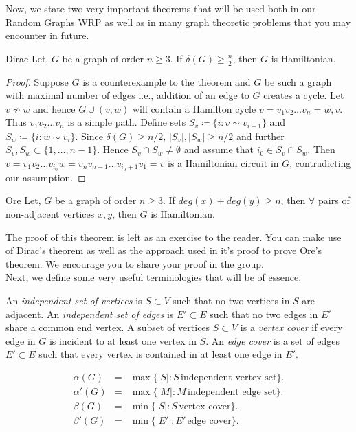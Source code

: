 \documentclass[../basic_graph_theory.tex]{subfiles}
\begin{document}
Now, we state two very important theorems that will be used both in our Random Graphs WRP as well as in many graph theoretic problems that you may encounter in future.

\begin{Thm}{Dirac}{}
    Let, $G$ be a graph of order $n \ge 3$. If $\delta(G) \ge \frac{n}{2}$, then $G$ is Hamiltonian.
\end{Thm}
\begin{proof}
    Suppose $G$ is a counterexample to the theorem and $G$ be such a graph with maximal number of edges i.e., addition of an edge to $G$ creates a cycle.  Let $v \nsim w$ and hence $G \cup (v,w)$ will contain a Hamilton cycle $v = v_1v_2\ldots v_n=w,v$. Thus $v_1v_2\ldots v_n$ is a simple path. Define sets $S_v \coloneqq \{ i : v \sim v_{i+1} \}$ and $S_w \coloneqq \{ i : w \sim v_i\}$. Since $\delta(G) \geq n/2$, $|S_v|, |S_w| \geq n/2$ and further $S_v, S_w \subset \{1,\ldots,n-1\}$. Hence $S_v \cap S_w \neq \emptyset$ and assume that $i_0 \in S_v \cap S_w$. Then $v = v_1v_2\ldots v_{i_0}w=v_nv_{n-1}\ldots v_{i_0+1}v_1=v$ is a Hamiltonian circuit in $G$, contradicting our assumption.
\end{proof}

\begin{Thm}{Ore}{}
    Let, $G$ be a graph of order $n \ge 3$. If $deg(x)+deg(y) \ge n$, then $\forall$ pairs of non-adjacent vertices $x,y$, then $G$ is Hamiltonian.
\end{Thm}

The proof of this theorem is left as an exercise to the reader. You can make use of Dirac's theorem as well as the approach used in it's proof to prove Ore's theorem. We encourage you to share your proof in the group.\\
Next, we define some very useful terminologies that will be of essence.\\

\begin{defn}  
    An {\em independent set of vertices} is $S \subset V$ such that no two vertices in $S$ are adjacent. An {\em independent set of edges} is $E' \subset E$ such that no two edges in $E'$ share a common end vertex. A subset of vertices $S \subset V$ is a {\em vertex cover} if every edge in $G$ is incident to at least one vertex in $S$. An {\em edge cover} is a set of edges $E' \subset E$ such that every vertex is contained in at least one edge in $E'$.
\end{defn}
\begin{defn}
    \begin{eqnarray*}
        \alpha(G) & = & \max \{|S| : S \, \mbox{independent vertex set} \}. \\
        \alpha'(G) & = & \max \{|M| : M \, \mbox{independent edge set} \}. \\
        \beta(G) & = & \min \{|S| : S \, \mbox{vertex cover} \}.  \\
        \beta'(G) & = & \min \{|E'| : E' \, \mbox{edge cover} \}.
    \end{eqnarray*}
\end{defn}
\end{document}
